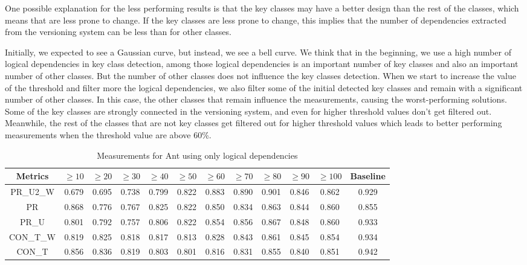 \documentclass[runningheads]{comsis2}
\begin{document}
One possible explanation for the less performing results is that the key classes may have a better design than the rest of the classes, which means that are less prone to change. If the key classes are less prone to change, this implies that the number of dependencies extracted from the versioning system can be less than for other classes.


Initially, we expected to see a Gaussian curve, but instead, we see a bell curve.  We think that in the beginning, we use a high number of logical dependencies in key class detection, among those logical dependencies is an important number of key classes and also an important number of other classes. But the number of other classes does not influence the key classes detection. When we start to increase the value of the threshold and filter more the logical dependencies, we also filter some of the initial detected key classes and remain with a significant number of other classes. In this case, the other classes that remain influence the measurements, causing the worst-performing solutions. 
Some of the key classes are strongly connected in the versioning system, and even for higher threshold values don't get filtered out. Meanwhile, the rest of the classes that are not key classes get filtered out for higher threshold values which leads to better performing measurements when the threshold value are above 60\%. 

\begin{table}[!h]
\setlength\tabcolsep{3.5pt}
\caption{Measurements for Ant using only logical dependencies}
\label{tab:measurementshistory:ant}
\centering
\begin{tabular}{|c|cccccccccc|c|}
\hline
Metrics &	$\geq10$	&	$\geq20$		&	$\geq30$		&	$\geq40$		&	$\geq50$		&	$\geq60$		&	$\geq70$		&	$\geq80$		&	$\geq90$		&	$\geq100$		&	Baseline \\
\hline

PR\_U2\_W	&	0.679	&	0.695	&	0.738	&	0.799	&	0.822	&	0.883	&	0.890	&	0.901	&	0.846	&	0.862	&	0.929	\\
PR	&	0.868	&	0.776	&	0.767	&	0.825	&	0.822	&	0.850	&	0.834	&	0.863	&	0.844	&	0.860	&	0.855	\\
PR\_U	&	0.801	&	0.792	&	0.757	&	0.806	&	0.822	&	0.854	&	0.856	&	0.867	&	0.848	&	0.860	&	0.933	\\
CON\_T\_W	&	0.819	&	0.825	&	0.818	&	0.817	&	0.813	&	0.828	&	0.843	&	0.861	&	0.845	&	0.854	&	0.934	\\
CON\_T	&	0.856	&	0.836	&	0.819	&	0.803	&	0.801	&	0.816	&	0.831	&	0.855	&	0.840	&	0.851	&	0.942	\\


\hline
\end{tabular}
\end{table}
\end{document}
